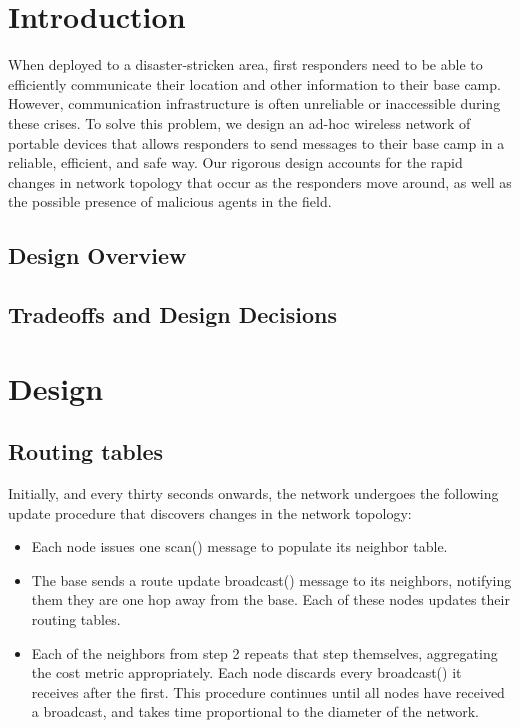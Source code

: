 \documentclass[letterpaper]{article}
\begin{document}
\section{Introduction}

When deployed to a disaster-stricken area, first responders need to be able to efficiently communicate their
location and other information to their base camp. However, communication infrastructure is often unreliable
or inaccessible during these crises. To solve this problem, we design an ad-hoc wireless network of portable
devices that allows responders to send messages to their base camp in a reliable, efficient, and safe way.
Our rigorous design accounts for the rapid changes in network topology that  occur as the responders move 
around, as well as the possible presence of malicious agents in the field. 

\subsection{Design Overview}

\subsection{Tradeoffs and Design Decisions}

\section{Design}

\subsection{Routing tables}

Initially, and every thirty seconds onwards, the network undergoes the following update procedure that 
discovers changes in the network topology:

\begin{itemize}
  \item Each node issues one scan() message to populate its neighbor table.
  \item The base sends a route update broadcast() message to its neighbors, notifying them they are one hop
        away from the base. Each of these nodes updates their routing tables.
  \item Each of the neighbors from step 2 repeats that step themselves, aggregating the cost metric
        appropriately. Each node discards every broadcast() it receives after the first. 
        This procedure continues until all nodes have received a broadcast, and takes time proportional 
        to the diameter of the network.
\end{itemize}
\end{document}
